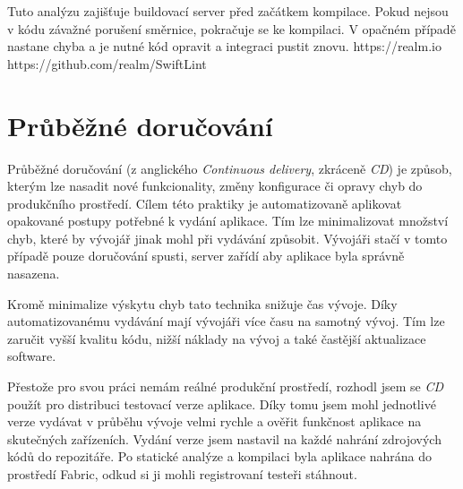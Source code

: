 Tuto analýzu zajišťuje buildovací server před začátkem kompilace.
Pokud nejsou v kódu závažné porušení směrnice, pokračuje se ke kompilaci.
V opačném případě nastane chyba a je nutné kód opravit a integraci pustit znovu.
https://realm.io
https://github.com/realm/SwiftLint

\section{Průběžné doručování}

Průběžné doručování (z anglického \textit{Continuous delivery}, zkráceně \textit{CD}) je způsob, kterým lze nasadit nové funkcionality, změny konfigurace či opravy chyb do produkčního prostředí.
Cílem této praktiky je automatizovaně aplikovat opakované postupy potřebné k vydání aplikace.
Tím lze minimalizovat množství chyb, které by vývojář jinak mohl při vydávání způsobit.
Vývojáři stačí v tomto případě pouze doručování spusti, server zařídí aby aplikace byla správně nasazena.

Kromě minimalize výskytu chyb tato technika snižuje čas vývoje.
Díky automatizovanému vydávání mají vývojáři více času na samotný vývoj.
Tím lze zaručit vyšší kvalitu kódu, nižší náklady na vývoj a také častější aktualizace software. \cite{continuousdelivery-what-is-ci}

Přestože pro svou práci nemám reálné produkční prostředí, rozhodl jsem se \textit{CD} použít pro distribuci testovací verze aplikace.
Díky tomu jsem mohl jednotlivé verze vydávat v průběhu vývoje velmi rychle a ověřit funkčnost aplikace na skutečných zařízeních.
Vydání verze jsem nastavil na každé nahrání zdrojových kódů do repozitáře.
Po statické analýze a kompilaci byla aplikace nahrána do prostředí Fabric, odkud si ji mohli registrovaní testeři stáhnout.
